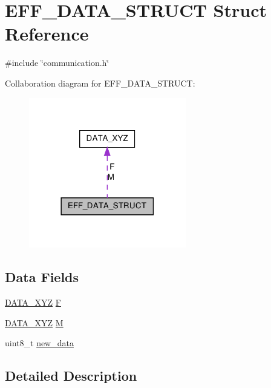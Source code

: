 \hypertarget{structEFF__DATA__STRUCT}{\section{E\-F\-F\-\_\-\-D\-A\-T\-A\-\_\-\-S\-T\-R\-U\-C\-T Struct Reference}
\label{structEFF__DATA__STRUCT}
}


{\ttfamily \#include \char`\"{}communication.\-h\char`\"{}}



Collaboration diagram for E\-F\-F\-\_\-\-D\-A\-T\-A\-\_\-\-S\-T\-R\-U\-C\-T\-:
\nopagebreak
\begin{figure}[H]
\begin{center}
\leavevmode
\includegraphics[width=194pt]{structEFF__DATA__STRUCT__coll__graph}
\end{center}
\end{figure}
\subsection*{Data Fields}
\begin{DoxyCompactItemize}
\item 
\hyperlink{structDATA__XYZ}{D\-A\-T\-A\-\_\-\-X\-Y\-Z} \hyperlink{structEFF__DATA__STRUCT_abe8952947b54bf9c247f3429ee3aeb44}{F}
\item 
\hyperlink{structDATA__XYZ}{D\-A\-T\-A\-\_\-\-X\-Y\-Z} \hyperlink{structEFF__DATA__STRUCT_aaf6e03b6e600295e0f5c706fc869e9d1}{M}
\item 
uint8\-\_\-t \hyperlink{structEFF__DATA__STRUCT_aa42ebc512dd79fa6ebf998162a149446}{new\-\_\-data}
\end{DoxyCompactItemize}


\subsection{Detailed Description}


